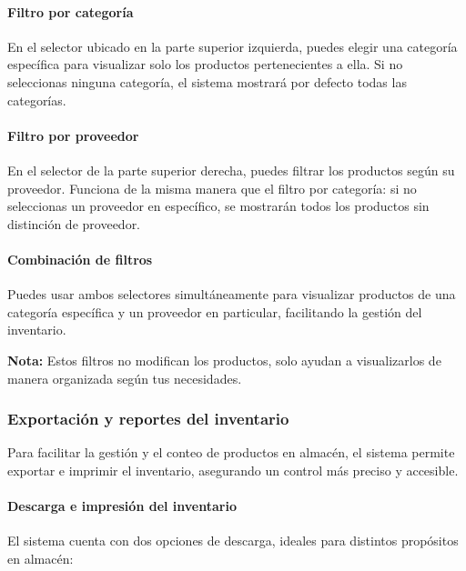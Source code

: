 \paragraph{Filtro por categoría}
\begin{justify}
En el selector ubicado en la parte superior izquierda, puedes elegir una categoría específica para visualizar solo los productos pertenecientes a ella.  
Si no seleccionas ninguna categoría, el sistema mostrará por defecto todas las categorías.
\end{justify}

\paragraph{Filtro por proveedor}
\begin{justify}
En el selector de la parte superior derecha, puedes filtrar los productos según su proveedor.  
Funciona de la misma manera que el filtro por categoría: si no seleccionas un proveedor en específico, se mostrarán todos los productos sin distinción de proveedor.
\end{justify}

\paragraph{Combinación de filtros}
\begin{justify}
Puedes usar ambos selectores simultáneamente para visualizar productos de una categoría específica y un proveedor en particular, facilitando la gestión del inventario.
\end{justify}

\begin{justify}
\textbf{Nota:} Estos filtros no modifican los productos, solo ayudan a visualizarlos de manera organizada según tus necesidades.
\end{justify}

\subsubsection{Exportación y reportes del inventario}

\begin{justify}
Para facilitar la gestión y el conteo de productos en almacén, el sistema permite exportar e imprimir el inventario, asegurando un control más preciso y accesible.
\end{justify}

\paragraph{Descarga e impresión del inventario}
\begin{justify}
El sistema cuenta con dos opciones de descarga, ideales para distintos propósitos en almacén:
\end{justify}



